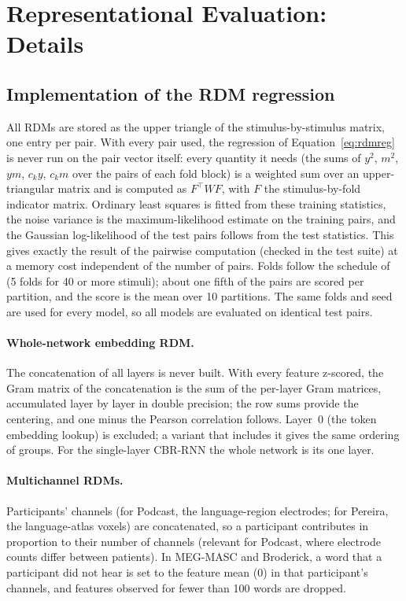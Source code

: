 \section{Representational Evaluation: Details}
\label{app:rsa}

\subsection{Implementation of the RDM regression}
\label{app:rsa-cv}

All RDMs are stored as the upper triangle of the stimulus-by-stimulus matrix, one entry per pair. With every pair used, the regression of Equation~\ref{eq:rdmreg} is never run on the pair vector itself: every quantity it needs (the sums of $y^2$, $m^2$, $ym$, $c_k y$, $c_k m$ over the pairs of each fold block) is a weighted sum over an upper-triangular matrix and is computed as $F^\top W F$, with $F$ the stimulus-by-fold indicator matrix. Ordinary least squares is fitted from these training statistics, the noise variance is the maximum-likelihood estimate on the training pairs, and the Gaussian log-likelihood of the test pairs follows from the test statistics. This gives exactly the result of the pairwise computation (checked in the test suite) at a memory cost independent of the number of pairs. Folds follow the schedule of \citet{schutt2023statistical} (5 folds for 40 or more stimuli); about one fifth of the pairs are scored per partition, and the score is the mean over 10 partitions. The same folds and seed are used for every model, so all models are evaluated on identical test pairs.

\paragraph{Whole-network embedding RDM.} The concatenation of all layers is never built. With every feature z-scored, the Gram matrix of the concatenation is the sum of the per-layer Gram matrices, accumulated layer by layer in double precision; the row sums provide the centering, and one minus the Pearson correlation follows. Layer~0 (the token embedding lookup) is excluded; a variant that includes it gives the same ordering of groups. For the single-layer CBR-RNN the whole network is its one layer.

\paragraph{Multichannel RDMs.} Participants' channels (for Podcast, the language-region electrodes; for Pereira, the language-atlas voxels) are concatenated, so a participant contributes in proportion to their number of channels (relevant for Podcast, where electrode counts differ between patients). In MEG-MASC and Broderick, a word that a participant did not hear is set to the feature mean (0) in that participant's channels, and features observed for fewer than 100 words are dropped.

